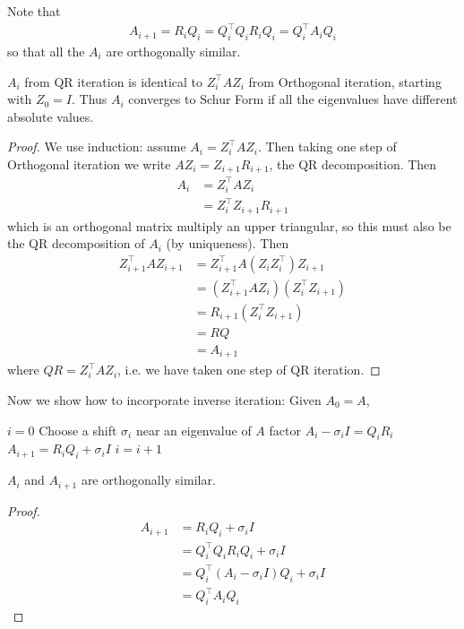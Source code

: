 \documentclass[11pt]{article}
\numberwithin{equation}{section}
\begin{document}
Note that \begin{align*}
    A_{i+1} = R_i Q_i = Q_i^\top Q_i R_i Q_i = Q_i^\top A_i Q_i
\end{align*}
so that all the $A_i$ are orthogonally similar.

\begin{theorem}
    $A_i$ from QR iteration is identical to $Z_i^\top AZ_i$ from Orthogonal iteration, starting with $Z_0 = I$.
    Thus $A_i$ converges to Schur Form if all the eigenvalues have different absolute values.
    \begin{proof}
        We use induction: assume $A_i = Z_i^\top AZ_i$. Then taking one step of Orthogonal iteration we write $AZ_i = Z_{i+1}R_{i+1}$, the QR decomposition.
        Then \begin{align*}
            A_i &= Z_i^\top AZ_i \\
            &= Z_i^\top Z_{i+1}R_{i+1}
        \end{align*}
        which is an orthogonal matrix multiply an upper triangular, so this must also be the QR decomposition of $A_i$ (by uniqueness). Then \begin{align*}
            Z_{i+1}^\top AZ_{i+1} &= Z_{i+1}^\top A (Z_i Z_i^\top) Z_{i+1} \\
            &= (Z_{i+1}^\top A Z_i) (Z_i^\top Z_{i+1}) \\
            &= R_{i+1} (Z_i^\top Z_{i+1}) \\
            &= RQ \\
            &= A_{i+1}
        \end{align*}
        where $QR = Z_i^\top AZ_i$, i.e. we have taken one step of QR iteration.
    \end{proof}
\end{theorem}

Now we show how to incorporate inverse iteration: Given $A_0=A$,
\begin{algorithmfrm}
    \begin{algorithmic}[1]
        \State $i = 0$
        \State Choose a shift $\sigma_i$ near an eigenvalue of $A$
        \State factor $A_i - \sigma_i I = Q_i R_i$
        \State $A_{i+1} = R_i Q_i + \sigma_i I$
        \State $i = i + 1$
        \EndWhile
    \end{algorithmic}
\end{algorithmfrm}

\begin{lemma}
    $A_{i}$ and $A_{i+1}$ are orthogonally similar.
    \begin{proof}
        \begin{align*}
            A_{i+1} &= R_i Q_i + \sigma_i I \\
            &= Q_i^\top Q_iR_i Q_i + \sigma_i I \\
            &= Q_i^\top (A_i - \sigma_i I) Q_i + \sigma_i I \\
            &= Q_i^\top A_i Q_i
        \end{align*}
    \end{proof}
\end{lemma}
\end{document}
